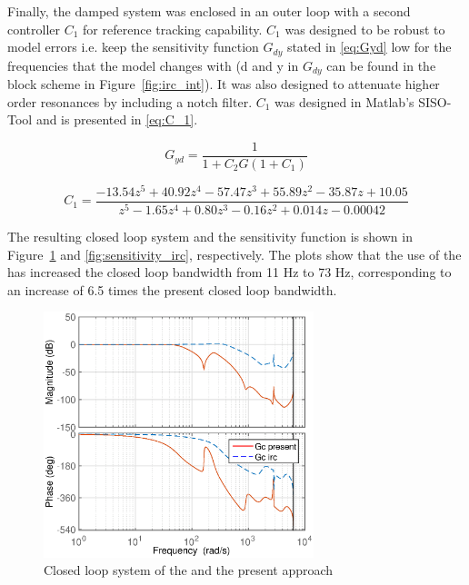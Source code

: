 Finally, the damped system was enclosed in an outer loop with a second controller $C_1$ for reference tracking capability. $C_1$ was designed to be robust to model errors i.e. keep the sensitivity function $G_{dy}$ stated in \eqref{eq:Gyd} low for the frequencies that the model changes with (d and y in $G_{dy}$ can be found in the block scheme in Figure~\ref{fig:irc_int}). It was also designed to attenuate higher order resonances by including a notch filter.  $C_1$ was designed in Matlab's SISO-Tool and is presented in \eqref{eq:C_1}.

\begin{equation}
  \label{eq:Gyd}
  G_{yd} = \frac{1}{1 + C_2G(1 + C_1)}
\end{equation}

\begin{equation}
  \label{eq:C_1}
  C_1 = \frac{-13.54 z^5 + 40.92 z^4 - 57.47 z^3 + 55.89 z^2 - 35.87 z + 10.05}{z^5 - 1.65 z^4 + 0.80 z^3 - 0.16 z^2 + 0.014 z - 0.00042}
\end{equation}

The resulting closed loop system and the sensitivity function is shown in Figure~\ref{fig:irc_totalclosed} and \ref{fig:sensitivity_irc}, respectively. The plots show that the use of the \abbrIRC has increased the closed loop bandwidth from 11 Hz to 73 Hz, corresponding to an increase of 6.5 times the present closed loop bandwidth.

\begin{figure}[h!]
  \centering
  \includegraphics[width=0.7\textwidth]{fig/matlab/totalclosedloop.eps}
  \caption{\label{fig:irc_totalclosed} Closed loop system of the \abbrIRC and the present approach}
\end{figure}

